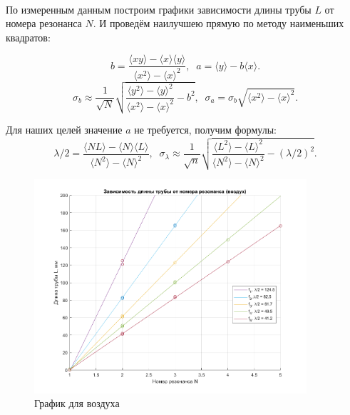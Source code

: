 \documentclass[a4paper,12pt]{article}
\begin{document}
\begin{enumerate}
\begin{enumerate}
\paragraph{} По измеренным данным построим графики зависимости длины трубы $L$ от номера резонанса $N$. И проведём наилучшею прямую по методу наименьших квадратов:

\begin{equation}
b = \frac{\langle xy \rangle - \langle x \rangle \langle y \rangle}{\langle x^2 \rangle - \langle x \rangle ^ 2}, \;\;
a = \langle y \rangle - b \langle x \rangle . \label{lsf}
\end{equation}
\begin{equation}
\sigma_b \approx \frac{1}{\sqrt{N}}\sqrt{\frac{\langle y^2 \rangle - \langle y \rangle ^ 2}{\langle x^2 \rangle - \langle x \rangle ^ 2} - b^2}, \;\;
\sigma_a = \sigma_b \sqrt{\langle x^2 \rangle - \langle x \rangle ^ 2}. \label{lsfvar}
\end{equation}

Для наших целей значение $a$ не требуется, получим формулы:
\begin{equation}
\lambda/2 = \frac{\langle NL \rangle - \langle N \rangle \langle L \rangle}{\langle N^2 \rangle - \langle N \rangle ^ 2}, \;\;
\sigma_{\lambda} \approx \frac{1}{\sqrt{n}}\sqrt{\frac{\langle L^2 \rangle - \langle L \rangle ^ 2}{\langle N^2 \rangle - \langle N \rangle ^ 2} - \left(\lambda/2\right)^2} . \label{lsf2}
\end{equation}

\begin{figure}[h]
\begin{center}
\includegraphics[width=0.9\textwidth]{plot_1.png}
\end{center}
\caption{График для воздуха}
\label{fig:plot1}
\end{figure}


\end{enumerate}
\end{enumerate}
\end{document}
